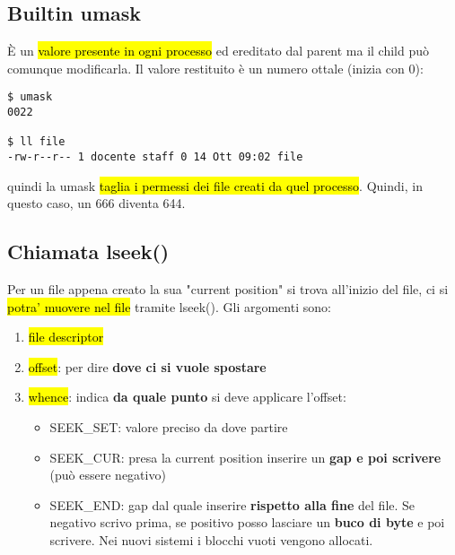 \subsection{Builtin umask}

È un \hl{valore presente in ogni processo} ed ereditato dal parent ma il child può comunque modificarla. Il valore restituito è un numero ottale (inizia con 0):

\begin{lstlisting}
$ umask
0022

$ ll file
-rw-r--r-- 1 docente staff 0 14 Ott 09:02 file
\end{lstlisting}

quindi la umask \hl{taglia i permessi dei file creati da quel processo}. Quindi, in questo caso, un 666 diventa 644.


\subsection{Chiamata lseek()}

Per un file appena creato la sua "current position" si trova all'inizio del file, ci si \hl{potra' muovere nel file} tramite lseek(). Gli argomenti sono:

\begin{enumerate}
	\item \hl{file descriptor}
	
	\item \hl{offset}: per dire \textbf{dove ci si vuole spostare}
	
	\item \hl{whence}: indica \textbf{da quale punto} si deve applicare l'offset:
	
		\begin{itemize}
			\item SEEK\_SET: valore preciso da dove partire
			
			\item SEEK\_CUR: presa la current position inserire un \textbf{gap e poi scrivere} (può essere negativo)
			
			\item SEEK\_END: gap dal quale inserire \textbf{rispetto alla fine} del file. Se negativo scrivo prima, se positivo posso lasciare un \textbf{buco di byte} e poi scrivere. Nei nuovi sistemi i blocchi vuoti vengono allocati.
		\end{itemize}
	
	
\end{enumerate}

